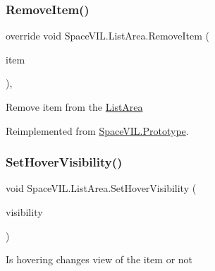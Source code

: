 \subsubsection{\texorpdfstring{Remove\+Item()}{RemoveItem()}}
{\footnotesize\ttfamily override void Space\+V\+I\+L.\+List\+Area.\+Remove\+Item (\begin{DoxyParamCaption}\item[{\mbox{\hyperlink{interface_space_v_i_l_1_1_core_1_1_i_base_item}{I\+Base\+Item}}}]{item }\end{DoxyParamCaption})\hspace{0.3cm}{\ttfamily [inline]}, {\ttfamily [virtual]}}



Remove item from the \mbox{\hyperlink{class_space_v_i_l_1_1_list_area}{List\+Area}} 



Reimplemented from \mbox{\hyperlink{class_space_v_i_l_1_1_prototype_a7a2aabccfe6389f71d0265fa73f0ae87}{Space\+V\+I\+L.\+Prototype}}.

\mbox{\label{class_space_v_i_l_1_1_list_area_ab4a8ef41e41ece5524e49a0244f5fd21}} 
\subsubsection{\texorpdfstring{Set\+Hover\+Visibility()}{SetHoverVisibility()}}
{\footnotesize\ttfamily void Space\+V\+I\+L.\+List\+Area.\+Set\+Hover\+Visibility (\begin{DoxyParamCaption}\item[{bool}]{visibility }\end{DoxyParamCaption})\hspace{0.3cm}{\ttfamily [inline]}}



Is hovering changes view of the item or not 

\mbox{\label{class_space_v_i_l_1_1_list_area_a14f2764a6ad13641bf4761f37a5ec2ae}} 
